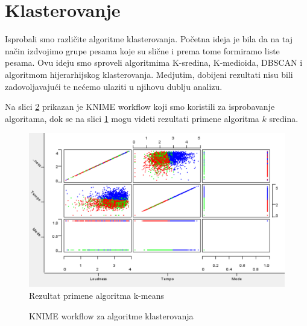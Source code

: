 \section{Klasterovanje}
\label{sec:Klasterovanje}

Isprobali smo razli\v{c}ite algoritme klasterovanja. Po\v{c}etna ideja je bila da na taj na\v{c}in izdvojimo grupe pesama koje su sli\v{c}ne i prema tome formiramo liste pesama. Ovu ideju smo sproveli algoritmima K-sredina, K-medioida, DBSCAN i algoritmom hijerarhijskog klasterovanja. Medjutim, dobijeni rezultati nisu bili zadovoljavaju\'c{}i te ne\'c{}emo ulaziti u njihovu dublju analizu.

Na slici \ref{fig:knime-klasterovanje} prikazan je KNIME workflow koji smo koristili za isprobavanje algoritama, dok se na slici \ref{fig:kmeans} mogu videti rezultati primene algoritma $k$ sredina.

\begin{figure}[H]
    \centering
    \includegraphics[scale=0.6]{resources/kmeans.png}
    \caption{Rezultat primene algoritma k-means}
    \label{fig:kmeans}
\end{figure}

\begin{figure}[H]
    \centering
    \caption{KNIME workflow za algoritme klasterovanja}
    \label{fig:knime-klasterovanje}
\end{figure}
